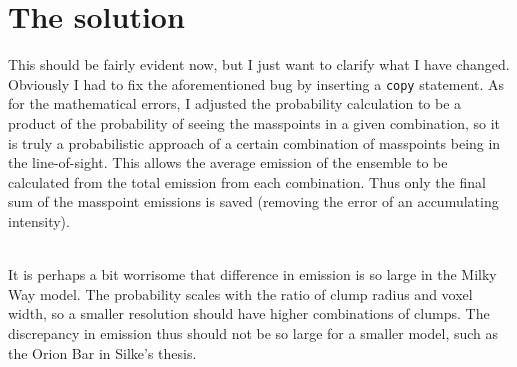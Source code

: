 \documentclass[onecolumn]{article}
\begin{document}
  \section{The solution}
  This should be fairly evident now, but I just want to clarify what I have changed. Obviously I had to fix the aforementioned bug by inserting a \texttt{copy} statement. As for the mathematical errors, I adjusted the probability calculation to be a product of the probability of seeing the masspoints in a given combination, so it is truly a probabilistic approach of a certain combination of masspoints being in the line-of-sight. This allows the average emission of the ensemble to be calculated from the total emission from each combination. Thus only the final sum of the masspoint emissions is saved (removing the error of an accumulating intensity).
  
  \hfill \\
  
  It is perhaps a bit worrisome that difference in emission is so large in the Milky Way model. The probability scales with the ratio of clump radius and voxel width, so a smaller resolution should have higher combinations of clumps. The discrepancy in emission thus should not be so large for a smaller model, such as the Orion Bar in Silke's thesis.
  
  \hfill \\
  
\end{document}
